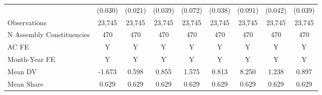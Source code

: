 {\begin{tabular}{l*{8}{c}}
            &     (0.030)         &     (0.021)         &     (0.039)         &     (0.072)         &     (0.038)         &     (0.091)         &     (0.042)         &     (0.039)         \\
Observations&      23,745         &      23,745         &      23,745         &      23,745         &      23,745         &      23,745         &      23,745         &      23,745         \\
N Assembly Constituencies&         470         &         470         &         470         &         470         &         470         &         470         &         470         &         470         \\
AC FE       &           Y         &           Y         &           Y         &           Y         &           Y         &           Y         &           Y         &           Y         \\
Month-Year FE&           Y         &           Y         &           Y         &           Y         &           Y         &           Y         &           Y         &           Y         \\
Mean DV     &      -1.673         &       0.598         &       0.855         &       1.575         &       0.813         &       8.250         &       1.238         &       0.897         \\
Mean Share  &       0.629         &       0.629         &       0.629         &       0.629         &       0.629         &       0.629         &       0.629         &       0.629         \\
\bottomrule
\end{tabular}
}
